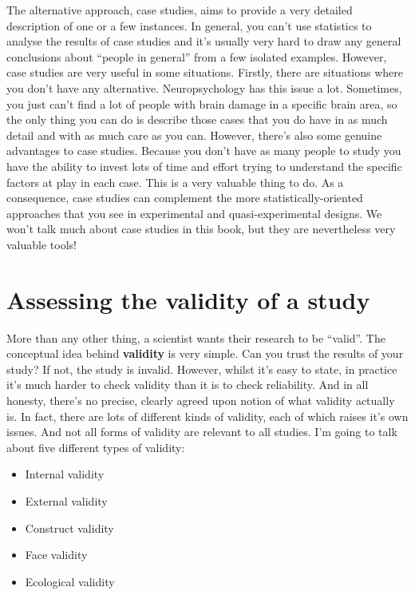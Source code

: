 \documentclass[
  letterpaper,
]{book}
\providecommand{\tightlist}{%
  \setlength{\itemsep}{0pt}\setlength{\parskip}{0pt}}\usepackage{longtable,booktabs,array}
\begin{document}
The alternative approach, case studies, aims to provide a very detailed
description of one or a few instances. In general, you can't use
statistics to analyse the results of case studies and it's usually very
hard to draw any general conclusions about ``people in general'' from a
few isolated examples. However, case studies are very useful in some
situations. Firstly, there are situations where you don't have any
alternative. Neuropsychology has this issue a lot. Sometimes, you just
can't find a lot of people with brain damage in a specific brain area,
so the only thing you can do is describe those cases that you do have in
as much detail and with as much care as you can. However, there's also
some genuine advantages to case studies. Because you don't have as many
people to study you have the ability to invest lots of time and effort
trying to understand the specific factors at play in each case. This is
a very valuable thing to do. As a consequence, case studies can
complement the more statistically-oriented approaches that you see in
experimental and quasi-experimental designs. We won't talk much about
case studies in this book, but they are nevertheless very valuable
tools!

\hypertarget{assessing-the-validity-of-a-study}{%
\section{Assessing the validity of a
study}\label{assessing-the-validity-of-a-study}}

More than any other thing, a scientist wants their research to be
``valid''. The conceptual idea behind \textbf{validity} is very simple.
Can you trust the results of your study? If not, the study is invalid.
However, whilst it's easy to state, in practice it's much harder to
check validity than it is to check reliability. And in all honesty,
there's no precise, clearly agreed upon notion of what validity actually
is. In fact, there are lots of different kinds of validity, each of
which raises it's own issues. And not all forms of validity are relevant
to all studies. I'm going to talk about five different types of
validity:

\begin{itemize}
\tightlist
\item
  Internal validity
\item
  External validity
\item
  Construct validity
\item
  Face validity
\item
  Ecological validity
\end{itemize}
\end{document}
